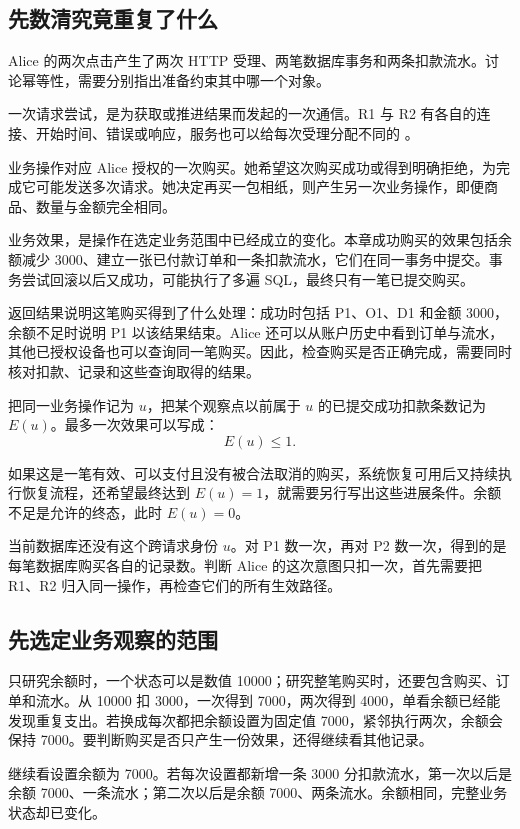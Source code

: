 \subsection*{先数清究竟重复了什么}

Alice 的两次点击产生了两次 HTTP 受理、两笔数据库事务和两条扣款流水。讨论幂等性，需要分别指出准备约束其中哪一个对象。

一次请求尝试，是为获取或推进结果而发起的一次通信。R1 与 R2 有各自的连接、开始时间、错误或响应，服务也可以给每次受理分配不同的 。

业务操作对应 Alice 授权的一次购买。她希望这次购买成功或得到明确拒绝，为完成它可能发送多次请求。她决定再买一包相纸，则产生另一次业务操作，即便商品、数量与金额完全相同。

业务效果，是操作在选定业务范围中已经成立的变化。本章成功购买的效果包括余额减少 3000、建立一张已付款订单和一条扣款流水，它们在同一事务中提交。事务尝试回滚以后又成功，可能执行了多遍 SQL，最终只有一笔已提交购买。

返回结果说明这笔购买得到了什么处理：成功时包括 P1、O1、D1 和金额 3000，余额不足时说明 P1 以该结果结束。Alice 还可以从账户历史中看到订单与流水，其他已授权设备也可以查询同一笔购买。因此，检查购买是否正确完成，需要同时核对扣款、记录和这些查询取得的结果。



把同一业务操作记为 $u$，把某个观察点以前属于 $u$ 的已提交成功扣款条数记为 $E(u)$。最多一次效果可以写成：
\[
 E(u)\leq 1.
\]

如果这是一笔有效、可以支付且没有被合法取消的购买，系统恢复可用后又持续执行恢复流程，还希望最终达到 $E(u)=1$，就需要另行写出这些进展条件。余额不足是允许的终态，此时 $E(u)=0$。

当前数据库还没有这个跨请求身份 $u$。对 P1 数一次，再对 P2 数一次，得到的是每笔数据库购买各自的记录数。判断 Alice 的这次意图只扣一次，首先需要把 R1、R2 归入同一操作，再检查它们的所有生效路径。

\subsection*{先选定业务观察的范围}

只研究余额时，一个状态可以是数值 10000；研究整笔购买时，还要包含购买、订单和流水。从 10000 扣 3000，一次得到 7000，两次得到 4000，单看余额已经能发现重复支出。若换成每次都把余额设置为固定值 7000，紧邻执行两次，余额会保持 7000。要判断购买是否只产生一份效果，还得继续看其他记录。

继续看设置余额为 7000。若每次设置都新增一条 3000 分扣款流水，第一次以后是余额 7000、一条流水；第二次以后是余额 7000、两条流水。余额相同，完整业务状态却已变化。

